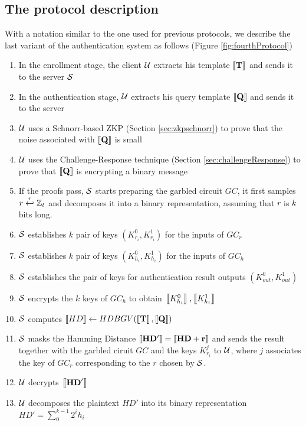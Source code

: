 \subsection{The protocol description}
\label{sec:4thprocSteps}
With a notation similar to the one used for previous protocols, we describe the last variant of the authentication system as follows (Figure \ref{fig:fourthProtocol})
\begin{enumerate}
\item In the enrollment stage, the client $\mathcal{U}$ extracts his template $\left\llbracket\mathbf{T}\right\rrbracket$ and sends it to the server $\mathcal{S}$
\item In the authentication stage, $\mathcal{U}$ extracts his query template $\left\llbracket\mathbf{Q}\right\rrbracket$ and sends it to the server
\item $\mathcal{U}$ uses a Schnorr-based ZKP (Section \ref{sec:zkpschnorr}) to prove that the noise associated with $\left\llbracket\mathbf{Q}\right\rrbracket$ is small
\item $\mathcal{U}$ uses the Challenge-Response technique (Section \ref{sec:challengeResponse}) to prove that $\left\llbracket\mathbf{Q}\right\rrbracket$ is encrypting a binary message
\item If the proofs pass, $\mathcal{S}$ starts preparing the garbled circuit $GC$, it first samples $r \stackrel{r}{\hookleftarrow} \mathbb{Z}_{t}$ and decomposes it into a binary representation, assuming that $r$ is $k$ bits long.
\item $\mathcal{S}$ establishes $k$ pair of keys $(K_{r_{i}}^{0}, K_{r_{i}}^{1})$ for the inputs of $GC_{r}$
\item $\mathcal{S}$ establishes $k$ pair of keys $(K_{h_{i}}^{0}, K_{h_{i}}^{1})$ for the inputs of $GC_{h}$
\item $\mathcal{S}$ establishes the pair of keys for authentication result outputs $(K_{out}^{0}, K_{out}^{1})$
\item $\mathcal{S}$ encrypts the $k$ keys of $GC_{h}$ to obtain $\left\llbracket K_{h_{i}}^{0}\right\rrbracket, \left\llbracket K_{h_{i}}^{1}\right\rrbracket$
\item $\mathcal{S}$ computes $\left\llbracket HD\right\rrbracket \gets HDBGV(\left\llbracket\mathbf{T}\right\rrbracket, \left\llbracket\mathbf{Q}\right\rrbracket)$
\item $\mathcal{S}$ masks the Hamming Distance $\left\llbracket\mathbf{HD'}\right\rrbracket = \left\llbracket\mathbf{HD + r}\right\rrbracket$ and sends the result together with the garbled ciruit $GC$ and the keys $K_{r_{i}}^{j}$ to $\mathcal{U}$, where $j$ associates the key of $GC_{r}$ corresponding to the $r$ chosen by $\mathcal{S}$.
\item $\mathcal{U}$ decrypts $\left\llbracket\mathbf{HD}'\right\rrbracket$
\item $\mathcal{U}$ decomposes the plaintext $HD'$ into its binary representation $HD' = \sum_{0}^{k-1}2^{i}h_{i}$

\end{enumerate}
